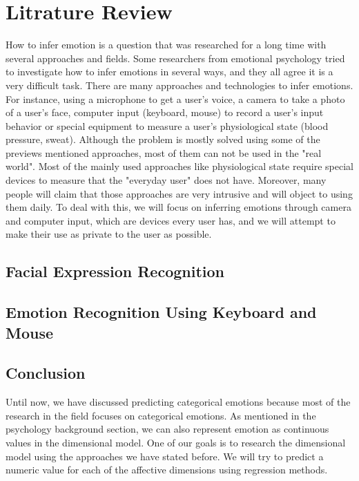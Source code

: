 \documentclass{article}
\begin{document}
\section{Litrature Review}
How to infer emotion is a question that was researched for a long time with several approaches and fields.
Some researchers from emotional psychology tried to investigate how to infer emotions in several ways, and they all agree
it is a very difficult task. There are many approaches and technologies to infer emotions.
For instance, using a microphone to get a user’s voice, a camera to take a photo of a user’s face, computer input (keyboard, mouse) to record a user’s
input behavior or special equipment to measure a user’s physiological state (blood pressure, sweat).
Although the problem is mostly solved using some of the previews mentioned approaches, most of them can not be used in the "real world".
Most of the mainly used approaches like physiological state require special devices to measure that the "everyday user" does not have.
Moreover, many people will claim that those approaches are very intrusive and will object to using them daily.
To deal with this, we will focus on inferring emotions through camera and computer input, which are devices every user has,
and we will attempt to make their use as private to the user as possible.

\subsection{Facial Expression Recognition} \label{section:fer}


\subsection{Emotion Recognition Using Keyboard and Mouse} \label{section:keyboard_mouse}


\subsection{Conclusion}

Until now, we have discussed predicting categorical emotions because most of the research in the 
field focuses on categorical emotions. As mentioned in the psychology background section, 
we can also represent emotion as continuous values in the dimensional model. 
One of our goals is to research the dimensional model using the approaches we have stated before. 
We will try to predict a numeric value for each of the affective dimensions using 
regression methods.
\par
\end{document}
